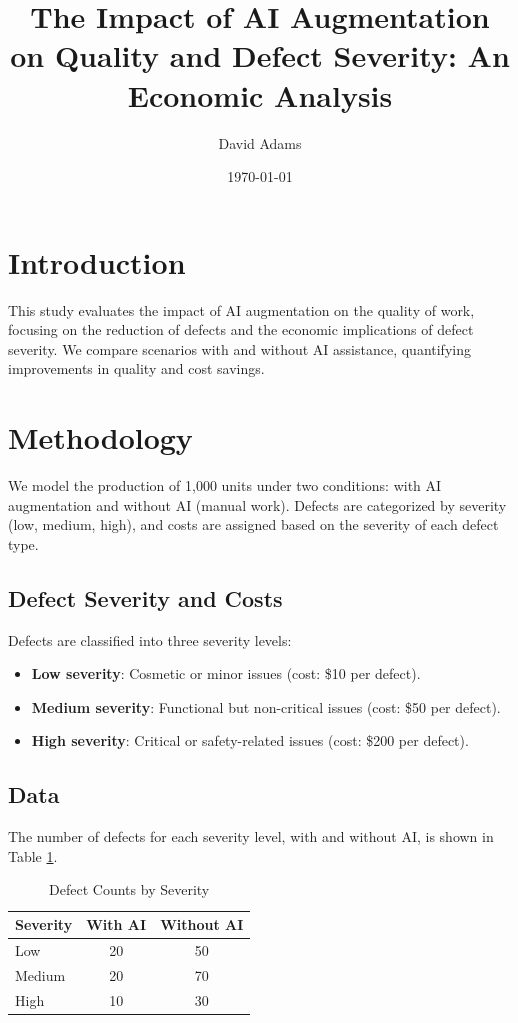 \documentclass{article}
\title{The Impact of AI Augmentation on Quality and Defect Severity: An Economic Analysis}
\author{David Adams}
\date{\today}
\begin{document}
\maketitle

\section{Introduction}
This study evaluates the impact of AI augmentation on the quality of work, focusing on the reduction of defects and the economic implications of defect severity. We compare scenarios with and without AI assistance, quantifying improvements in quality and cost savings.

\section{Methodology}
We model the production of 1,000 units under two conditions: with AI augmentation and without AI (manual work). Defects are categorized by severity (low, medium, high), and costs are assigned based on the severity of each defect type.

\subsection{Defect Severity and Costs}
Defects are classified into three severity levels:
\begin{itemize}
    \item \textbf{Low severity}: Cosmetic or minor issues (cost: \$10 per defect).
    \item \textbf{Medium severity}: Functional but non-critical issues (cost: \$50 per defect).
    \item \textbf{High severity}: Critical or safety-related issues (cost: \$200 per defect).
\end{itemize}

\subsection{Data}
The number of defects for each severity level, with and without AI, is shown in Table \ref{table:defects}.

\begin{table}[h]
\centering
\caption{Defect Counts by Severity}
\label{table:defects}
\begin{tabular}{lcc}
\toprule
Severity      & With AI & Without AI \\
\midrule
Low           & 20      & 50         \\
Medium        & 20      & 70         \\
High          & 10      & 30         \\
\bottomrule
\end{tabular}
\end{table}
\end{document}
